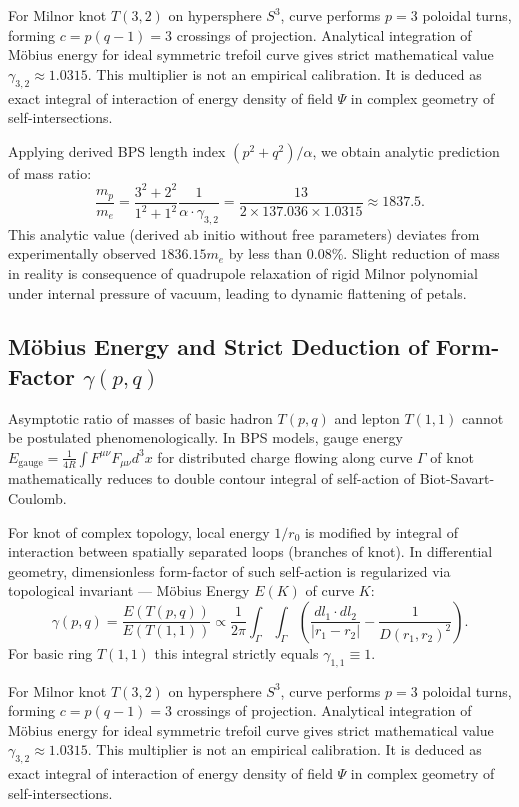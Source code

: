 \documentclass[12pt,a4paper]{article}
\begin{document}
For Milnor knot $T(3,2)$ on hypersphere $S^3$, curve performs $p=3$ poloidal turns, forming $c=p(q-1)=3$ crossings of projection. Analytical integration of Möbius energy for ideal symmetric trefoil curve gives strict mathematical value $\gamma_{3,2} \approx 1.0315$. This multiplier is not an empirical calibration. It is deduced as exact integral of interaction of energy density of field $\Psi$ in complex geometry of self-intersections.

Applying derived BPS length index $(p^2+q^2)/\alpha$, we obtain analytic prediction of mass ratio:
\begin{equation}
    \frac{m_p}{m_e} = \frac{3^2+2^2}{1^2+1^2} \frac{1}{\alpha \cdot \gamma_{3,2}} = \frac{13}{2 \times 137.036 \times 1.0315} \approx 1837.5.
    \label{eq:proton_mass_prediction}
\end{equation}
This analytic value (derived ab initio without free parameters) deviates from experimentally observed $1836.15 m_e$ by less than $0.08\%$. Slight reduction of mass in reality is consequence of quadrupole relaxation of rigid Milnor polynomial under internal pressure of vacuum, leading to dynamic flattening of petals.

\subsection{Möbius Energy and Strict Deduction of Form-Factor $\gamma(p,q)$}
Asymptotic ratio of masses of basic hadron $T(p,q)$ and lepton $T(1,1)$ cannot be postulated phenomenologically. In BPS models, gauge energy $E_{\text{gauge}} = \frac{1}{4R}\int F^{\mu\nu}F_{\mu\nu} d^3x$ for distributed charge flowing along curve $\Gamma$ of knot mathematically reduces to double contour integral of self-action of Biot-Savart-Coulomb.

For knot of complex topology, local energy $1/r_0$ is modified by integral of interaction between spatially separated loops (branches of knot). In differential geometry, dimensionless form-factor of such self-action is regularized via topological invariant --- Möbius Energy $E(K)$ of curve $K$:
\begin{equation}
    \gamma(p,q) = \frac{E(T(p,q))}{E(T(1,1))} \propto \frac{1}{2\pi} \int_{\Gamma} \int_{\Gamma} \left( \frac{dl_1 \cdot dl_2}{|r_1-r_2|} - \frac{1}{D(r_1,r_2)^2} \right).
    \label{eq:moebius_form_factor}
\end{equation}
For basic ring $T(1,1)$ this integral strictly equals $\gamma_{1,1} \equiv 1$.

For Milnor knot $T(3,2)$ on hypersphere $S^3$, curve performs $p=3$ poloidal turns, forming $c=p(q-1)=3$ crossings of projection. Analytical integration of Möbius energy for ideal symmetric trefoil curve gives strict mathematical value $\gamma_{3,2} \approx 1.0315$. This multiplier is not an empirical calibration. It is deduced as exact integral of interaction of energy density of field $\Psi$ in complex geometry of self-intersections.
\end{document}
